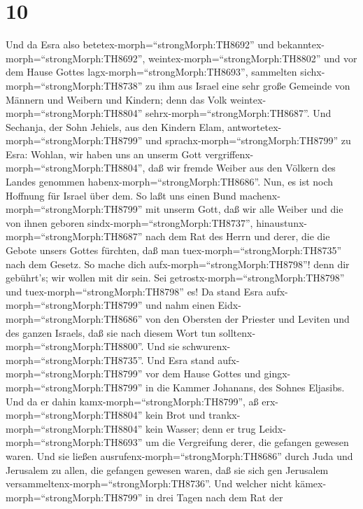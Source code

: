 \hypertarget{section-9}{%
\section{10}\label{section-9}}

 Und da Esra also betetex-morph=``strongMorph:TH8692'' und
bekanntex-morph=``strongMorph:TH8692'',
weintex-morph=``strongMorph:TH8802'' und vor dem Hause Gottes
lagx-morph=``strongMorph:TH8693'', sammelten
sichx-morph=``strongMorph:TH8738'' zu ihm aus Israel eine sehr große
Gemeinde von Männern und Weibern und Kindern; denn das Volk
weintex-morph=``strongMorph:TH8804'' sehrx-morph=``strongMorph:TH8687''.
 Und Sechanja, der Sohn Jehiels, aus den Kindern Elam,
antwortetex-morph=``strongMorph:TH8799'' und
sprachx-morph=``strongMorph:TH8799'' zu Esra: Wohlan, wir haben uns an
unserm Gott vergriffenx-morph=``strongMorph:TH8804'', daß wir fremde
Weiber aus den Völkern des Landes genommen
habenx-morph=``strongMorph:TH8686''. Nun, es ist noch Hoffnung für
Israel über dem.  So laßt uns einen Bund
machenx-morph=``strongMorph:TH8799'' mit unserm Gott, daß wir alle
Weiber und die von ihnen geboren sindx-morph=``strongMorph:TH8737'',
hinaustunx-morph=``strongMorph:TH8687'' nach dem Rat des Herrn und
derer, die die Gebote unsers Gottes fürchten, daß man
tuex-morph=``strongMorph:TH8735'' nach dem Gesetz.  So mache
dich aufx-morph=``strongMorph:TH8798''! denn dir gebührt's; wir wollen
mit dir sein. Sei getrostx-morph=``strongMorph:TH8798'' und
tuex-morph=``strongMorph:TH8798'' es!  Da stand Esra
aufx-morph=``strongMorph:TH8799'' und nahm einen
Eidx-morph=``strongMorph:TH8686'' von den Obersten der Priester und
Leviten und des ganzen Israels, daß sie nach diesem Wort tun
solltenx-morph=``strongMorph:TH8800''. Und sie
schwurenx-morph=``strongMorph:TH8735''.  Und Esra stand
aufx-morph=``strongMorph:TH8799'' vor dem Hause Gottes und
gingx-morph=``strongMorph:TH8799'' in die Kammer Johanans, des Sohnes
Eljasibs. Und da er dahin kamx-morph=``strongMorph:TH8799'', aß
erx-morph=``strongMorph:TH8804'' kein Brot und
trankx-morph=``strongMorph:TH8804'' kein Wasser; denn er trug
Leidx-morph=``strongMorph:TH8693'' um die Vergreifung derer, die
gefangen gewesen waren.  Und sie ließen
ausrufenx-morph=``strongMorph:TH8686'' durch Juda und Jerusalem zu
allen, die gefangen gewesen waren, daß sie sich gen Jerusalem
versammeltenx-morph=``strongMorph:TH8736''.  Und welcher
nicht kämex-morph=``strongMorph:TH8799'' in drei Tagen nach dem Rat der
